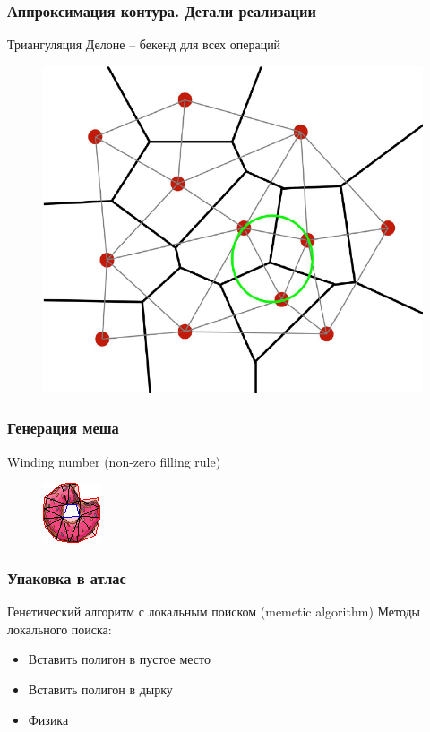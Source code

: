 \documentclass[10pt, unicode]{beamer}
\begin{document}
    \begin{frame}
        \frametitle{Аппроксимация контура. Детали реализации}
        Триангуляция Делоне\cite{Delaunay} -- бекенд для всех операций
        \begin{figure}[H]
            \centering
            \includegraphics[width=0.7\linewidth, keepaspectratio]{DelaunayAndVoronoi.png}
        \end{figure}
    \end{frame}
    \begin{frame}
        \frametitle{Генерация меша}
        Winding number (non-zero filling rule)
        \begin{figure}[H]
            \centering
            \includegraphics[scale=1.5]{donutpixel_mesh.png}
        \end{figure}
    \end{frame}
    \begin{frame}
        \frametitle{Упаковка в атлас}
        Генетический алгоритм с локальным поиском (memetic algorithm)
        Методы локального поиска:
        \begin{itemize}
            \item Вставить полигон в пустое место
            \item Вставить полигон в дырку
            \item Физика
        \end{itemize}
    \end{frame}
\end{document}
